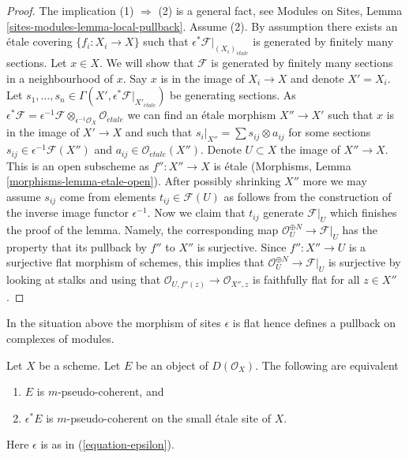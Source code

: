 \begin{proof}
The implication (1) $\Rightarrow$ (2) is a general fact, see
Modules on Sites, Lemma \ref{sites-modules-lemma-local-pullback}.
Assume (2). By assumption there exists an \'etale covering
$\{f_i : X_i \to X\}$ such that
$\epsilon^*\mathcal{F}|_{(X_i)_{\acute{e}tale}}$ is generated by
finitely many sections. Let $x \in X$. We will show that $\mathcal{F}$
is generated by finitely many sections in a neighbourhood of $x$.
Say $x$ is in the image of $X_i \to X$ and denote $X' = X_i$. Let
$s_1, \ldots, s_n \in
\Gamma(X', \epsilon^*\mathcal{F}|_{X'_{\acute{e}tale}})$
be generating sections. As
$\epsilon^*\mathcal{F} =
\epsilon^{-1}\mathcal{F} \otimes_{\epsilon^{-1}\mathcal{O}_X}
\mathcal{O}_{\acute{e}tale}$
we can find an \'etale morphism $X'' \to X'$ such that $x$ is
in the image of $X' \to X$ and such that
$s_i|_{X''} = \sum s_{ij} \otimes a_{ij}$ for some sections
$s_{ij} \in \epsilon^{-1}\mathcal{F}(X'')$ and
$a_{ij} \in \mathcal{O}_{\acute{e}tale}(X'')$. Denote $U \subset X$ the image
of $X'' \to X$. This is an open subscheme as $f'' : X'' \to X$ is \'etale
(Morphisms, Lemma \ref{morphisms-lemma-etale-open}). After possibly
shrinking $X''$ more we may assume $s_{ij}$ come from elements
$t_{ij} \in \mathcal{F}(U)$ as follows from the construction of
the inverse image functor $\epsilon^{-1}$. Now we claim that
$t_{ij}$ generate $\mathcal{F}|_U$ which finishes the proof
of the lemma. Namely, the corresponding map
$\mathcal{O}_U^{\oplus N} \to \mathcal{F}|_U$ has the property
that its pullback by $f''$ to $X''$ is surjective. Since $f'' : X'' \to U$
is a surjective flat morphism of schemes, this implies that
$\mathcal{O}_U^{\oplus N} \to \mathcal{F}|_U$ is surjective by
looking at stalks and using that
$\mathcal{O}_{U, f''(z)} \to \mathcal{O}_{X'', z}$
is faithfully flat for all $z \in X''$.
\end{proof}

\noindent
In the situation above the morphism of sites $\epsilon$ is flat
hence defines a pullback on complexes of modules.

\begin{lemma}
\label{lemma-descend-pseudo-coherent}
Let $X$ be a scheme. Let $E$ be an object of $D(\mathcal{O}_X)$.
The following are equivalent
\begin{enumerate}
\item $E$ is $m$-pseudo-coherent, and
\item $\epsilon^*E$ is $m$-pseudo-coherent on the small \'etale site of $X$.
\end{enumerate}
Here $\epsilon$ is as in (\ref{equation-epsilon}).
\end{lemma}

